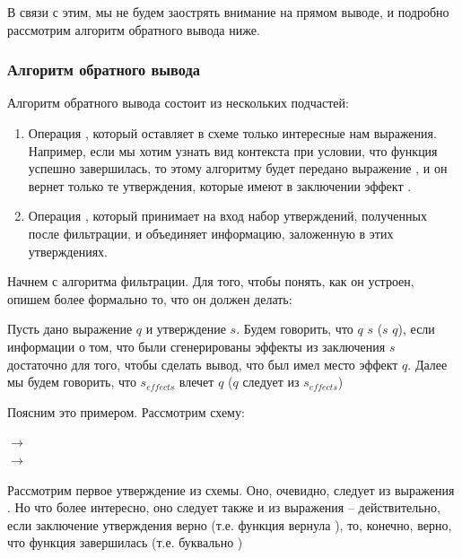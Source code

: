 В связи с этим, мы не будем заострять внимание на прямом выводе, и подробно рассмотрим алгоритм обратного вывода ниже.


\subsubsection{Алгоритм обратного вывода}

\label{section-back-inference}

Алгоритм обратного вывода состоит из нескольких подчастей:

\begin{enumerate}
    \item Операция , который оставляет в схеме только интересные нам выражения. Например, если мы хотим узнать вид контекста при условии, что функция успешно завершилась, то этому алгоритму будет передано выражение , и он вернет только те утверждения, которые имеют в заключении эффект .

    \item Операция , который принимает на вход набор утверждений, полученных после фильтрации, и объединяет информацию, заложенную в этих утверждениях.
\end{enumerate}

Начнем с алгоритма фильтрации. Для того, чтобы понять, как он устроен, опишем более формально то, что он должен делать:

\begin{definition}
    Пусть дано выражение $q$ и утверждение $s$. Будем говорить, что $q$  $s$ ($s$  $q$), если информации о том, что были сгенерированы эффекты из заключения $s$ достаточно для того, чтобы сделать вывод, что был имел место эффект $q$. Далее мы будем говорить, что $s_{effects}$ влечет $q$ ($q$ следует из $s_{effects}$)
\end{definition}

Поясним это примером. Рассмотрим схему:

{
     $\rightarrow$  \\
     $\rightarrow$ 
}{}

Рассмотрим первое утверждение из схемы. Оно, очевидно, следует из выражения . Но что более интересно, оно следует также и из выражения  -- действительно, если заключение утверждения верно (т.е. функция вернула ), то, конечно, верно, что функция завершилась (т.е. буквально )



